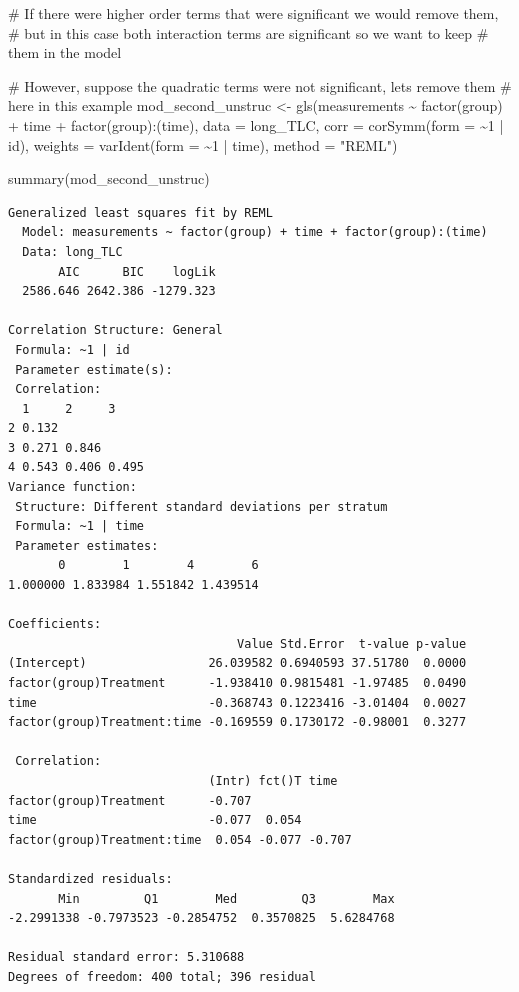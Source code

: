 \documentclass[
  letterpaper,
  DIV=11,
  numbers=noendperiod]{scrreprt}
\newenvironment{Shaded}{\begin{snugshade}}{\end{snugshade}}
\newcommand{\AttributeTok}[1]{\textcolor[rgb]{0.40,0.45,0.13}{#1}}
\newcommand{\CommentTok}[1]{\textcolor[rgb]{0.37,0.37,0.37}{#1}}
\newcommand{\DecValTok}[1]{\textcolor[rgb]{0.68,0.00,0.00}{#1}}
\newcommand{\FunctionTok}[1]{\textcolor[rgb]{0.28,0.35,0.67}{#1}}
\newcommand{\NormalTok}[1]{\textcolor[rgb]{0.00,0.23,0.31}{#1}}
\newcommand{\OtherTok}[1]{\textcolor[rgb]{0.00,0.23,0.31}{#1}}
\newcommand{\SpecialCharTok}[1]{\textcolor[rgb]{0.37,0.37,0.37}{#1}}
\newcommand{\StringTok}[1]{\textcolor[rgb]{0.13,0.47,0.30}{#1}}
\begin{document}
\begin{Shaded}
\begin{Highlighting}[]
\CommentTok{\# If there were higher order terms that were significant we would remove them,}
\CommentTok{\# but in this case both interaction terms are significant so we want to keep}
\CommentTok{\# them in the model}

\CommentTok{\# However, suppose the quadratic terms were not significant, lets remove them}
\CommentTok{\# here in this example}
\NormalTok{mod\_second\_unstruc }\OtherTok{\textless{}{-}} \FunctionTok{gls}\NormalTok{(measurements }\SpecialCharTok{\textasciitilde{}} \FunctionTok{factor}\NormalTok{(group) }\SpecialCharTok{+}\NormalTok{ time }\SpecialCharTok{+} \FunctionTok{factor}\NormalTok{(group)}\SpecialCharTok{:}\NormalTok{(time),}
    \AttributeTok{data =}\NormalTok{ long\_TLC, }\AttributeTok{corr =} \FunctionTok{corSymm}\NormalTok{(}\AttributeTok{form =} \SpecialCharTok{\textasciitilde{}}\DecValTok{1} \SpecialCharTok{|}\NormalTok{ id), }\AttributeTok{weights =} \FunctionTok{varIdent}\NormalTok{(}\AttributeTok{form =} \SpecialCharTok{\textasciitilde{}}\DecValTok{1} \SpecialCharTok{|}
\NormalTok{        time), }\AttributeTok{method =} \StringTok{"REML"}\NormalTok{)}

\FunctionTok{summary}\NormalTok{(mod\_second\_unstruc)}
\end{Highlighting}
\end{Shaded}

\begin{verbatim}
Generalized least squares fit by REML
  Model: measurements ~ factor(group) + time + factor(group):(time) 
  Data: long_TLC 
       AIC      BIC    logLik
  2586.646 2642.386 -1279.323

Correlation Structure: General
 Formula: ~1 | id 
 Parameter estimate(s):
 Correlation: 
  1     2     3    
2 0.132            
3 0.271 0.846      
4 0.543 0.406 0.495
Variance function:
 Structure: Different standard deviations per stratum
 Formula: ~1 | time 
 Parameter estimates:
       0        1        4        6 
1.000000 1.833984 1.551842 1.439514 

Coefficients:
                                Value Std.Error  t-value p-value
(Intercept)                 26.039582 0.6940593 37.51780  0.0000
factor(group)Treatment      -1.938410 0.9815481 -1.97485  0.0490
time                        -0.368743 0.1223416 -3.01404  0.0027
factor(group)Treatment:time -0.169559 0.1730172 -0.98001  0.3277

 Correlation: 
                            (Intr) fct()T time  
factor(group)Treatment      -0.707              
time                        -0.077  0.054       
factor(group)Treatment:time  0.054 -0.077 -0.707

Standardized residuals:
       Min         Q1        Med         Q3        Max 
-2.2991338 -0.7973523 -0.2854752  0.3570825  5.6284768 

Residual standard error: 5.310688 
Degrees of freedom: 400 total; 396 residual
\end{verbatim}
\end{document}
